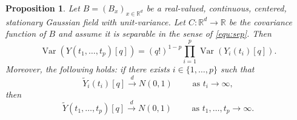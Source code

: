\documentclass[12pt]{article}
\DeclareMathOperator{\var}{Var}
\DeclareMathOperator{\1}{1}
\newcommand{\R}{\mathbb{R}}
\theoremstyle{plain}
\newtheorem{proposition}[theorem]{Proposition}
\theoremstyle{definition}
\begin{document}
\begin{proposition}\label{prop:suffHq}
    Let $B=(B_x)_{x\in\R^d}$ be a real-valued, continuous, centered, stationary Gaussian field with unit-variance. Let $C:\R^d \rightarrow \R$ be the covariance function of $B$ and assume it is separable in the sense of \eqref{equ:sep}. Then \begin{equation}\label{equ:varHq}
        \var(Y(t_1,\ldots,t_p)[q]) = (q!)^{1-p} \prod_{i=1}^p \var (Y_i{(t_i)}[q]).
    \end{equation}
    Moreover, the following holds: if there exists $i\in\{1,\ldots,p\}$ such that
    \begin{equation}
        \widetilde{Y}_{i}(t_i)[q]\overset{d}{\rightarrow} N(0,1) \quad \quad \text{ as } t_i \to \infty,
    \end{equation}
    then
        \begin{equation}
         \widetilde{Y}(t_1,\ldots,t_p)[q]\overset{d}{\rightarrow} N(0,1) \quad \quad \text{ as } t_1,\ldots,t_p \to \infty.
        \end{equation}
\end{proposition}
\end{document}
